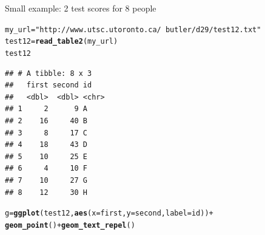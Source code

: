 \documentclass[unknownkeysallowed]{beamer}\usepackage[]{graphicx}\usepackage[]{color}
\makeatletter
\newcommand{\hlstr}[1]{\textcolor[rgb]{0.192,0.494,0.8}{#1}}%
\newcommand{\hlopt}[1]{\textcolor[rgb]{0,0,0}{#1}}%
\newcommand{\hlstd}[1]{\textcolor[rgb]{0.345,0.345,0.345}{#1}}%
\newcommand{\hlkwb}[1]{\textcolor[rgb]{0.69,0.353,0.396}{#1}}%
\newcommand{\hlkwc}[1]{\textcolor[rgb]{0.333,0.667,0.333}{#1}}%
\newcommand{\hlkwd}[1]{\textcolor[rgb]{0.737,0.353,0.396}{\textbf{#1}}}%
\newenvironment{kframe}{%
 \def\at@end@of@kframe{}%
 \ifinner\ifhmode%
  \def\at@end@of@kframe{\end{minipage}}%
  \begin{minipage}{\columnwidth}%
 \fi\fi%
 \def\FrameCommand##1{\hskip\@totalleftmargin \hskip-\fboxsep
 \colorbox{shadecolor}{##1}\hskip-\fboxsep
     \hskip-\linewidth \hskip-\@totalleftmargin \hskip\columnwidth}%
 \MakeFramed {\advance\hsize-\width
   \@totalleftmargin\z@ \linewidth\hsize
   \@setminipage}}%
 {\par\unskip\endMakeFramed%
 \at@end@of@kframe}
\newenvironment{knitrout}{}{} %
\makeatother
\begin{document}
\begin{frame}[fragile]{Small example: 2 test scores for 8 people}

\begin{knitrout}\small
{}\color{fgcolor}\begin{kframe}
\begin{alltt}
\hlstd{my_url}\hlkwb{=}\hlstr{"http://www.utsc.utoronto.ca/~butler/d29/test12.txt"}
\hlstd{test12}\hlkwb{=}\hlkwd{read_table2}\hlstd{(my_url)}
\hlstd{test12}
\end{alltt}
\begin{verbatim}
## # A tibble: 8 x 3
##   first second id   
##   <dbl>  <dbl> <chr>
## 1     2      9 A    
## 2    16     40 B    
## 3     8     17 C    
## 4    18     43 D    
## 5    10     25 E    
## 6     4     10 F    
## 7    10     27 G    
## 8    12     30 H
\end{verbatim}
\end{kframe}
\end{knitrout}

\begin{knitrout}
\color{fgcolor}\begin{kframe}
\begin{alltt}
\hlstd{g}\hlkwb{=}\hlkwd{ggplot}\hlstd{(test12,}\hlkwd{aes}\hlstd{(}\hlkwc{x}\hlstd{=first,}\hlkwc{y}\hlstd{=second,}\hlkwc{label}\hlstd{=id))}\hlopt{+}
  \hlkwd{geom_point}\hlstd{()}\hlopt{+}\hlkwd{geom_text_repel}\hlstd{()}
\end{alltt}
\end{kframe}
\end{knitrout}
    
\end{frame}
\end{document}
